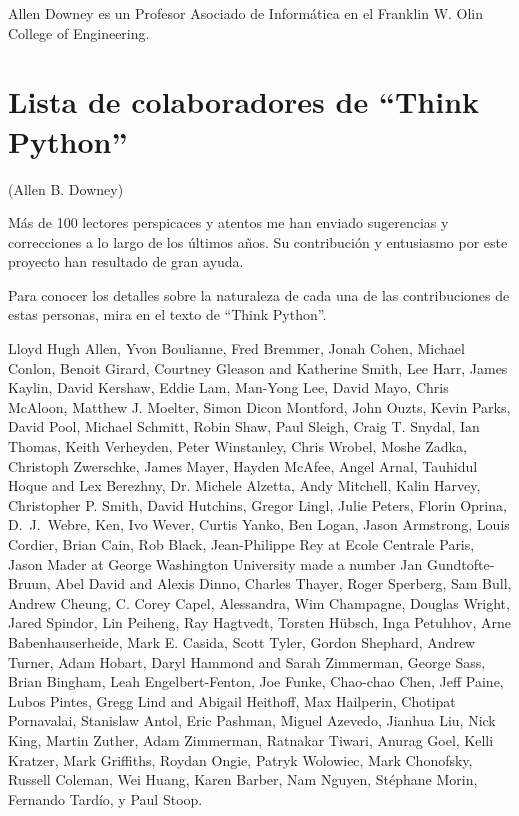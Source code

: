 Allen Downey es un Profesor Asociado de Informática en
el Franklin W. Olin College of Engineering.

\section*{Lista de colaboradores de ``Think Python''}


(Allen B. Downey)

Más de 100 lectores perspicaces y atentos me han enviado
sugerencias y correcciones a lo largo de los últimos años. Su
contribución y entusiasmo por este proyecto han resultado de
gran ayuda.

Para conocer los detalles sobre la naturaleza de cada una de las contribuciones
de estas personas, mira en el texto de ``Think Python''.

Lloyd Hugh Allen,
Yvon Boulianne,
Fred Bremmer,
Jonah Cohen,
Michael Conlon,
Benoit Girard,
Courtney Gleason and Katherine Smith,
Lee Harr,
James Kaylin,
David Kershaw,
Eddie Lam,
Man-Yong Lee,
David Mayo,
Chris McAloon,
Matthew J. Moelter,
Simon Dicon Montford,
John Ouzts,
Kevin Parks,
David Pool,
Michael Schmitt,
Robin Shaw,
Paul Sleigh,
Craig T. Snydal,
Ian Thomas,
Keith Verheyden,
Peter Winstanley,
Chris Wrobel,
Moshe Zadka,
Christoph Zwerschke,
James Mayer,
Hayden McAfee,
Angel Arnal,
Tauhidul Hoque and Lex Berezhny,
Dr. Michele Alzetta,
Andy Mitchell,
Kalin Harvey,
Christopher P. Smith,
David Hutchins,
Gregor Lingl,
Julie Peters,
Florin Oprina,
D.~J.~Webre,
Ken,
Ivo Wever,
Curtis Yanko,
Ben Logan,
Jason Armstrong,
Louis Cordier,
Brian Cain,
Rob Black,
Jean-Philippe Rey at Ecole Centrale Paris,
Jason Mader at George Washington University made a number
Jan Gundtofte-Bruun,
Abel David and Alexis Dinno,
Charles Thayer,
Roger Sperberg,
Sam Bull,
Andrew Cheung,
C. Corey Capel,
Alessandra,
Wim Champagne,
Douglas Wright,
Jared Spindor,
Lin Peiheng,
Ray Hagtvedt,
Torsten H\"{u}bsch,
Inga Petuhhov,
Arne Babenhauserheide,
Mark E. Casida,
Scott Tyler,
Gordon Shephard,
Andrew Turner,
Adam Hobart,
Daryl Hammond and Sarah Zimmerman,
George Sass,
Brian Bingham,
Leah Engelbert-Fenton,
Joe Funke,
Chao-chao Chen,
Jeff Paine,
Lubos Pintes,
Gregg Lind and Abigail Heithoff,
Max Hailperin,
Chotipat Pornavalai,
Stanislaw Antol,
Eric Pashman,
Miguel Azevedo,
Jianhua Liu,
Nick King,
Martin Zuther,
Adam Zimmerman,
Ratnakar Tiwari,
Anurag Goel,
Kelli Kratzer,
Mark Griffiths,
Roydan Ongie,
Patryk Wolowiec,
Mark Chonofsky,
Russell Coleman,
Wei Huang,
Karen Barber,
Nam Nguyen,
St\'{e}phane Morin,
Fernando Tard\'{i}o,
y
Paul Stoop.

